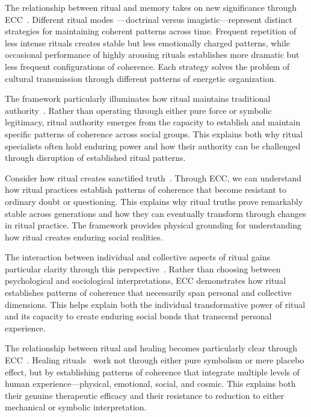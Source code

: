 The relationship between ritual and memory takes on new significance through ECC~\cite{whitehouse2004modes}. Different ritual modes~—doctrinal versus imagistic—represent distinct strategies for maintaining coherent patterns across time. Frequent repetition of less intense rituals creates stable but less emotionally charged patterns, while occasional performance of highly arousing rituals establishes more dramatic but less frequent configurations of coherence. Each strategy solves the problem of cultural transmission through different patterns of energetic organization.

The framework particularly illuminates how ritual maintains traditional authority~\cite{rappaport1999ritual,bourdieu1990logic}. Rather than operating through either pure force or symbolic legitimacy, ritual authority emerges from the capacity to establish and maintain specific patterns of coherence across social groups. This explains both why ritual specialists often hold enduring power and how their authority can be challenged through disruption of established ritual patterns.

Consider how ritual creates sanctified truth~\cite{rappaport1999ritual,bell1992ritual}. Through ECC, we can understand how ritual practices establish patterns of coherence that become resistant to ordinary doubt or questioning. This explains why ritual truths prove remarkably stable across generations and how they can eventually transform through changes in ritual practice. The framework provides physical grounding for understanding how ritual creates enduring social realities.

The interaction between individual and collective aspects of ritual gains particular clarity through this perspective~\cite{csordas1994embodiment,strathern2004partial}. Rather than choosing between psychological and sociological interpretations, ECC demonstrates how ritual establishes patterns of coherence that necessarily span personal and collective dimensions. This helps explain both the individual transformative power of ritual and its capacity to create enduring social bonds that transcend personal experience.

The relationship between ritual and healing becomes particularly clear through ECC~\cite{csordas1994embodiment,desjarlais1992body}. Healing rituals~ work not through either pure symbolism or mere placebo effect, but by establishing patterns of coherence that integrate multiple levels of human experience—physical, emotional, social, and cosmic. This explains both their genuine therapeutic efficacy and their resistance to reduction to either mechanical or symbolic interpretation.

